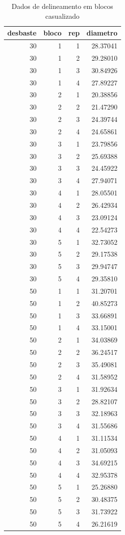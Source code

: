 \documentclass[
]{article}
\begin{document}
\begin{table}

\caption{\label{tab:unnamed-chunk-62}Dados de delineamento em blocos casualizado}
\centering
\begin{tabular}[t]{r|r|r|r}
\hline
desbaste & bloco & rep & diametro\\
\hline
30 & 1 & 1 & 28.37041\\
\hline
30 & 1 & 2 & 29.28010\\
\hline
30 & 1 & 3 & 30.84926\\
\hline
30 & 1 & 4 & 27.89227\\
\hline
30 & 2 & 1 & 20.38856\\
\hline
30 & 2 & 2 & 21.47290\\
\hline
30 & 2 & 3 & 24.39744\\
\hline
30 & 2 & 4 & 24.65861\\
\hline
30 & 3 & 1 & 23.79856\\
\hline
30 & 3 & 2 & 25.69388\\
\hline
30 & 3 & 3 & 24.45922\\
\hline
30 & 3 & 4 & 27.94071\\
\hline
30 & 4 & 1 & 28.05501\\
\hline
30 & 4 & 2 & 26.42934\\
\hline
30 & 4 & 3 & 23.09124\\
\hline
30 & 4 & 4 & 22.54273\\
\hline
30 & 5 & 1 & 32.73052\\
\hline
30 & 5 & 2 & 29.17538\\
\hline
30 & 5 & 3 & 29.94747\\
\hline
30 & 5 & 4 & 29.35810\\
\hline
50 & 1 & 1 & 31.20701\\
\hline
50 & 1 & 2 & 40.85273\\
\hline
50 & 1 & 3 & 33.66891\\
\hline
50 & 1 & 4 & 33.15001\\
\hline
50 & 2 & 1 & 34.03869\\
\hline
50 & 2 & 2 & 36.24517\\
\hline
50 & 2 & 3 & 35.49081\\
\hline
50 & 2 & 4 & 31.58952\\
\hline
50 & 3 & 1 & 31.92634\\
\hline
50 & 3 & 2 & 28.82107\\
\hline
50 & 3 & 3 & 32.18963\\
\hline
50 & 3 & 4 & 31.55686\\
\hline
50 & 4 & 1 & 31.11534\\
\hline
50 & 4 & 2 & 31.05093\\
\hline
50 & 4 & 3 & 34.69215\\
\hline
50 & 4 & 4 & 32.95378\\
\hline
50 & 5 & 1 & 25.26880\\
\hline
50 & 5 & 2 & 30.48375\\
\hline
50 & 5 & 3 & 31.73922\\
\hline
50 & 5 & 4 & 26.21619\\
\hline
\end{tabular}
\end{table}
\end{document}
